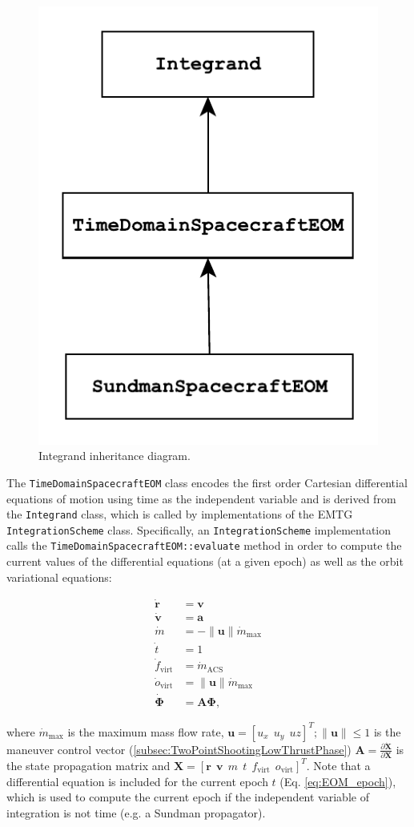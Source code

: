 \begin{figure}[h!]
    \centering
    \includegraphics[width=0.3\linewidth]{./astrodynamics/Integrand_EOM_inheritance.pdf}
    \caption{\label{fig:Integrand_EOM_inheritance} Integrand inheritance diagram.}
\end{figure}

The \texttt{TimeDomainSpacecraftEOM} class encodes the first order Cartesian differential equations of motion using time as the independent variable and is derived from the \texttt{Integrand} class, which is called by implementations of the EMTG \texttt{IntegrationScheme} class. Specifically, an \texttt{IntegrationScheme} implementation calls the \texttt{TimeDomainSpacecraftEOM::evaluate} method in order to compute the current values of the differential equations (at a given epoch) as well as the orbit variational equations:

\begin{align}
\dot{\mathbf{r}} &= \mathbf{v} \label{eq:EOM_v}\\
\dot{\mathbf{v}} &= \mathbf{a} \label{eq:EOM_a} \\
\dot{m} &= -\|\mathbf{u}\|\dot{m}_{\text{max}} \label{eq:EOM_m} \\
\dot{t} &= 1 \label{eq:EOM_epoch} \\
\dot{f}_{\text{virt}} &= \dot{m}_{\text{ACS}} \label{eq:EOM_fuel} \\
\dot{o}_{\text{virt}} &= \|\mathbf{u}\|\dot{m}_{\text{max}} \label{eq:EOM_oxidizer} \\
\dot{\mathbf{\Phi}} &= \mathbf{A} \mathbf{\Phi} \label{eq:variational_eq},
\end{align}

\noindent where $\dot{m}_{\text{max}}$ is the maximum mass flow rate, $\mathbf{u} = \left[ u_x~~u_y~~uz \right]^T; \|\mathbf{u}\| \le 1$ is the maneuver control vector (\ref{subsec:TwoPointShootingLowThrustPhase}) $\mathbf{A} = \frac{\partial \dot{\mathbf{X}}}{\partial \mathbf{X}}$ is the state propagation matrix and $\mathbf{X} = \left[\mathbf{r} ~~ \mathbf{v} ~~ m ~~ t ~~ f_{\text{virt}} ~~ o_{\text{virt}} \right]^T$. Note that a differential equation is included for the current epoch $t$ (Eq. \ref{eq:EOM_epoch}), which is used to compute the current epoch if the independent variable of integration is not time (e.g. a Sundman propagator).

